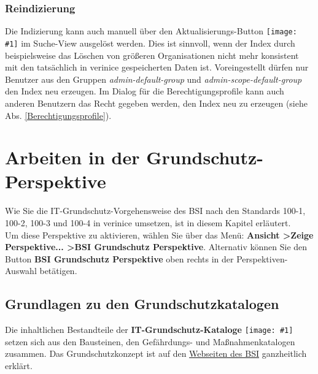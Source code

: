 \documentclass[a4paper,10pt]{book}
\newcommand{\icon}[1]{\texttt{[image: \#1]}}
\begin{document}
\subsection{Reindizierung}
\label{sec:indizierung}

Die Indizierung kann auch manuell über den
Aktualisierungs-Button \icon{Icon/Aktualisieren.png}
im Suche-View ausgelöst werden. Dies ist sinnvoll, wenn der Index
durch beispielsweise das Löschen von größeren Organisationen nicht
mehr konsistent mit den tatsächlich in verinice gespeicherten Daten
ist. Voreingestellt dürfen nur Benutzer aus den Gruppen \textit{admin-default-group} und \textit{admin-scope-default-group} den Index neu erzeugen.
Im Dialog für die Berechtigungsprofile kann auch anderen Benutzern das Recht gegeben werden, den Index neu zu erzeugen (siehe Abs. \ref{Berechtigungsprofile}).



\chapter{Arbeiten in der Grundschutz-Perspektive}
\label{Arbeiten in der Grundschutz-Perspektive}
Wie Sie die IT-Grundschutz-Vorgehensweise des BSI nach den Standards 100-1, 100-2, 100-3 und 100-4 in verinice umsetzen,
ist in diesem Kapitel erläutert.
\newline\\
Um diese Perspektive zu aktivieren, wählen Sie über das Menü: \textbf{Ansicht \textgreater Zeige Perspektive... \textgreater BSI Grundschutz Perspektive}.
Alternativ können Sie den Button \textbf{BSI Grundschutz Perspektive} oben rechts in der Perspektiven-Auswahl betätigen.

\section{Grundlagen zu den Grundschutzkatalogen}
Die inhaltlichen Bestandteile der \textbf{IT-Grundschutz-Kataloge} \icon{Icon/GS_Kataloge.png} setzen sich
aus den Bausteinen, den Gefährdungs- und Maßnahmenkatalogen zusammen. Das Grundschutzkonzept ist auf
den \href{https://www.bsi.bund.de/cln_156/DE/Themen/weitereThemen/ITGrundschutzKataloge/itgrundschutzkataloge_node.html}{Webseiten des BSI}
ganzheitlich erklärt.
\end{document}
